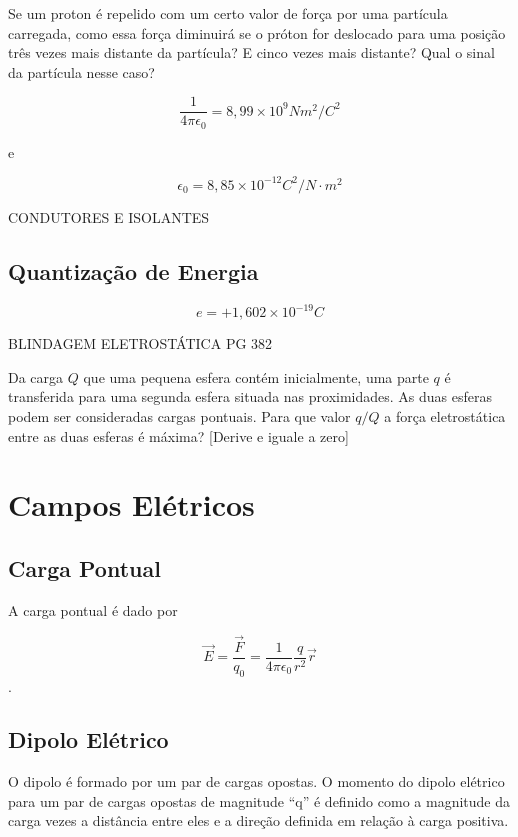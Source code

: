\begin{exe}
Se um proton é repelido com um certo valor de força por uma partícula carregada, como essa força diminuirá se o próton for deslocado para uma posição três vezes mais distante da partícula? E cinco vezes mais distante? Qual o sinal da partícula nesse caso?
\end{exe}

\begin{equation}\label{18.2}
    \dfrac{1}{4\pi \epsilon_0}=8,99\times 10^9 Nm^2/C^2
\end{equation}

e

\begin{equation}\label{18.3}
    \epsilon_0=8,85\times 10^{-12} C^2/N \cdot m^2
\end{equation}

CONDUTORES E ISOLANTES

\subsection{Quantização de Energia}

\begin{equation}\label{18.4}
    e=+1,602 \times 10^{-19} C
\end{equation}

BLINDAGEM ELETROSTÁTICA PG 382

\begin{exe}
 Da carga $Q$ que uma pequena esfera contém inicialmente, uma parte $q$ é transferida para uma segunda esfera situada nas proximidades. As duas esferas podem ser consideradas cargas pontuais. Para que valor $q/Q$ a força eletrostática entre as duas esferas é máxima? [Derive e iguale a zero]
\end{exe}

\section{Campos Elétricos}
\subsection{Carga Pontual}
A carga pontual é dado por

\begin{equation}\label{18.5}
    \vec{E}=\dfrac{\vec{F}}{q_0}=\dfrac{1}{4\pi \epsilon_0} \dfrac{q}{r^2} \vec{r}
\end{equation}.

\subsection{Dipolo Elétrico}
O dipolo é formado por um par de cargas opostas. O momento do dipolo elétrico para um par de cargas opostas de magnitude ``q'' é definido como a magnitude da carga vezes a distância entre eles e a direção definida em relação à carga positiva.


